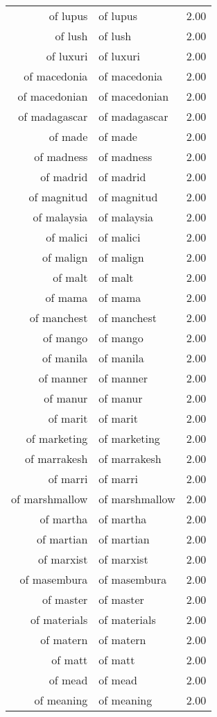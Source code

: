 \begin{table}[ht]
\begin{tabular}{rlr}
  of lupus & of lupus & 2.00 \\ 
  of lush & of lush & 2.00 \\ 
  of luxuri & of luxuri & 2.00 \\ 
  of macedonia & of macedonia & 2.00 \\ 
  of macedonian & of macedonian & 2.00 \\ 
  of madagascar & of madagascar & 2.00 \\ 
  of made & of made & 2.00 \\ 
  of madness & of madness & 2.00 \\ 
  of madrid & of madrid & 2.00 \\ 
  of magnitud & of magnitud & 2.00 \\ 
  of malaysia & of malaysia & 2.00 \\ 
  of malici & of malici & 2.00 \\ 
  of malign & of malign & 2.00 \\ 
  of malt & of malt & 2.00 \\ 
  of mama & of mama & 2.00 \\ 
  of manchest & of manchest & 2.00 \\ 
  of mango & of mango & 2.00 \\ 
  of manila & of manila & 2.00 \\ 
  of manner & of manner & 2.00 \\ 
  of manur & of manur & 2.00 \\ 
  of marit & of marit & 2.00 \\ 
  of marketing & of marketing & 2.00 \\ 
  of marrakesh & of marrakesh & 2.00 \\ 
  of marri & of marri & 2.00 \\ 
  of marshmallow & of marshmallow & 2.00 \\ 
  of martha & of martha & 2.00 \\ 
  of martian & of martian & 2.00 \\ 
  of marxist & of marxist & 2.00 \\ 
  of masembura & of masembura & 2.00 \\ 
  of master & of master & 2.00 \\ 
  of materials & of materials & 2.00 \\ 
  of matern & of matern & 2.00 \\ 
  of matt & of matt & 2.00 \\ 
  of mead & of mead & 2.00 \\ 
  of meaning & of meaning & 2.00 \\ 

\end{tabular}
\end{table}
